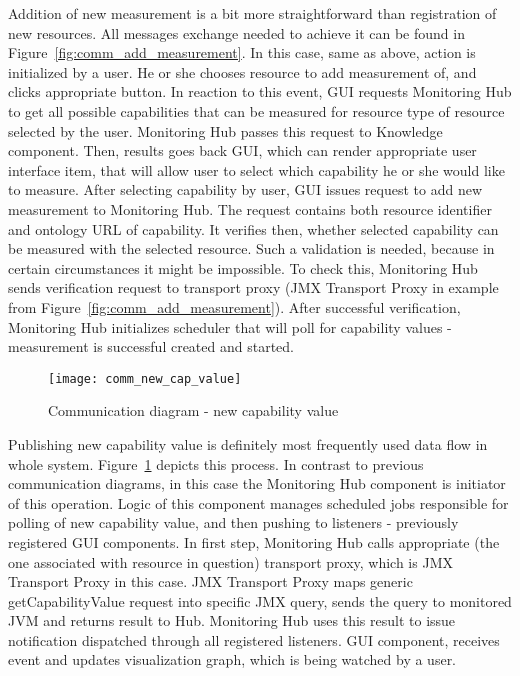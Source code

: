 Addition of new measurement is a bit more straightforward than registration of new resources. All messages exchange
needed to achieve it can be found in Figure~\ref{fig:comm_add_measurement}. In this case, same as above, action is
initialized by a user. He or she chooses resource to add measurement of, and clicks appropriate button. In reaction
to this event, GUI  requests Monitoring Hub to get all possible capabilities that can be measured for resource type of
resource selected by the user. Monitoring Hub passes this request to Knowledge component. Then, results goes back GUI,
which can render appropriate user interface item, that will allow user to select which capability he or she would like
to measure. After selecting capability by user, GUI issues request to add new measurement to Monitoring Hub. The request
contains both resource identifier and ontology URL of capability. It verifies then, whether selected capability can be
measured with the selected resource. Such a validation is needed, because in certain circumstances it might
be impossible. To check this, Monitoring Hub sends verification request to transport proxy (JMX Transport Proxy in
example from Figure~\ref{fig:comm_add_measurement}). After successful verification, Monitoring Hub initializes scheduler
that will poll for capability values - measurement is successful created and started.


\begin{figure}[ht]
  \centering
  \texttt{[image: comm\_new\_cap\_value]}
  \caption{Communication diagram - new capability value}
  \label{fig:comm_new_cap_value}
\end{figure}

Publishing new capability value is definitely most frequently used data flow in whole
system. Figure~\ref{fig:comm_new_cap_value} depicts this process. In contrast to previous communication diagrams, in
this case the Monitoring Hub component is initiator of this operation. Logic of this component manages
scheduled jobs responsible for polling of new capability value, and then pushing to listeners - previously registered
GUI components. In first step, Monitoring Hub calls appropriate (the one associated with resource in question) transport
proxy, which is JMX Transport Proxy in this case. JMX Transport Proxy maps generic getCapabilityValue request into
specific JMX query, sends the query to monitored JVM and returns result to Hub. Monitoring Hub uses this result to issue
notification dispatched through all registered listeners. GUI component, receives event and updates visualization graph,
which is being watched by a user.



